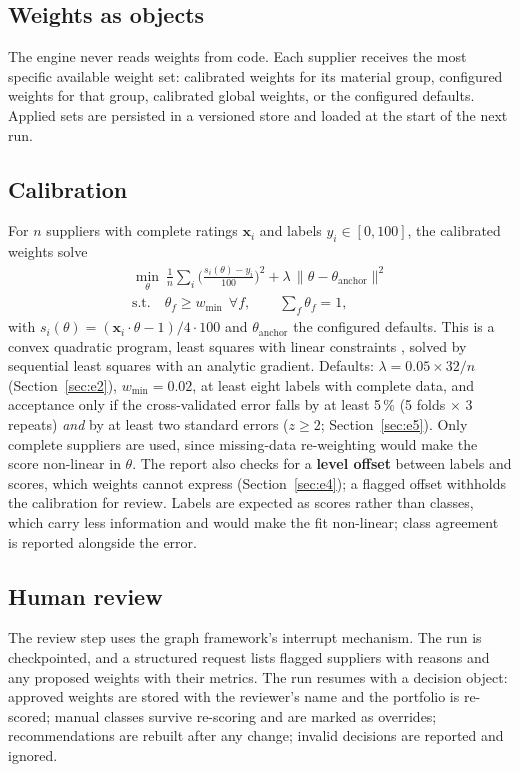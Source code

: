 \documentclass[10pt,twocolumn,a4paper]{article}
\begin{document}
\subsection{Weights as objects}
The engine never reads weights from code. Each supplier receives the most specific
available weight set: calibrated weights for its material group, configured weights for
that group, calibrated global weights, or the configured defaults. Applied sets are
persisted in a versioned store and loaded at the start of the next run.

\subsection{Calibration}
For $n$ suppliers with complete ratings $\mathbf{x}_i$ and labels $y_i\in[0,100]$, the
calibrated weights solve
\begin{equation}
  \begin{gathered}
  \min_{\theta}\ \frac{1}{n}\sum_{i}\Big(\frac{s_i(\theta)-y_i}{100}\Big)^2
  + \lambda\,\lVert\theta-\theta_{\text{anchor}}\rVert^2 \\
  \text{s.t.}\quad \theta_f\geq w_{\min}\ \ \forall f, \qquad \textstyle\sum_f\theta_f=1,
  \end{gathered}
\end{equation}
with $s_i(\theta)=(\mathbf{x}_i\cdot\theta-1)/4\cdot100$ and $\theta_{\text{anchor}}$ the
configured defaults. This is a convex quadratic program, least squares with linear
constraints \cite{lawson1995}, solved by sequential least squares with an analytic
gradient. Defaults: $\lambda = 0.05\times 32/n$ (Section~\ref{sec:e2}), $w_{\min}=0.02$,
at least eight labels with complete data, and acceptance only if the cross-validated
error falls by at least 5\,\% (5 folds $\times$ 3 repeats) \emph{and} by at least two
standard errors ($z\geq2$; Section~\ref{sec:e5}). Only complete suppliers are used, since
missing-data re-weighting would make the score non-linear in $\theta$. The report also
checks for a \textbf{level offset} between labels and scores, which weights cannot
express (Section~\ref{sec:e4}); a flagged offset withholds the calibration for review.
Labels are expected as scores rather than classes, which carry less information and
would make the fit non-linear; class agreement is reported alongside the error.

\subsection{Human review}
The review step uses the graph framework's interrupt mechanism. The run is checkpointed,
and a structured request lists flagged suppliers with reasons and any proposed weights
with their metrics. The run resumes with a decision object: approved weights are stored
with the reviewer's name and the portfolio is re-scored; manual classes survive
re-scoring and are marked as overrides; recommendations are rebuilt after any change;
invalid decisions are reported and ignored.
\end{document}
